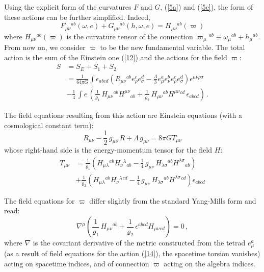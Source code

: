\documentclass [prd,reprint,eqsecnum,nofootinbib]  {revtex4-1}
\begin{document}
Using the explicit form of the curvatures $F$ and $G$, (\ref{5a})
and (\ref{5c}), the form of these actions can be further simplified.
Indeed,
$$
F_{\mu\nu}{}^{ab}(\omega, e) + G_{\mu\nu}{}^{ab}(h,\omega,e) =
H_{\mu\nu}{}^{ab}(\varpi)
$$
where $H_{\mu\nu}{}^{ab}(\varpi)$ is the curvature tensor of the
connection $\varpi_{\mu}{}^{ab}\equiv
\omega_{\mu}{}^{ab}+h_{\mu}{}^{ab}$. From now on, we consider
$\varpi$ to be the new fundamental variable. The total action is the
sum of the Einstein one (\ref{12}) and the actions for the field
$\varpi$:
\begin{align}
S &= S_E + S_1 +S_2 \nonumber\\
&=\frac{1}{64\pi
G}\int\epsilon_{abcd}\left(R_{\mu\nu}{}^{ab}e_{\rho}^{c}e_{\sigma}^{d}
-\frac{\Lambda}{3}e_{\mu}^{a}e_{\nu}^{b}e_{\rho}^{ c}e_{\sigma}^{
d}\right)\epsilon^{\mu\nu\rho\sigma}\nonumber\\
&-\frac14\,\int  e\, \left(\frac1{\varrho_1}\, H_{\mu\nu}{}^{ab}
H^{\mu\nu}{}_{ab}+ \frac1{\varrho_2}\,H_{\mu\nu}{}^{ab}
H^{\mu\nu}{}^{cd}\,\epsilon_{abcd}\right)\, .\label{14}
\end{align}

The field equations resulting from this action are Einstein
equations (with a cosmological constant term):
\begin{equation}\label{15a}
    R_{\mu\nu}-\frac12\, g_{\mu\nu}\, R +\Lambda\, g_{\mu\nu}= 8\pi G T_{\mu\nu}
\end{equation}
whose right-hand side is the energy-momentum tensor for the field
$H$:
\begin{align}
    T_{\mu\nu} &= \frac{1}{\varrho_1}\left(H_{\mu\lambda}{}^{ab} H_\nu{}^\lambda{}_{ab} -
    \frac14\, g_{\mu\nu}\,H_{\lambda\sigma}{}^{ab}
    H^{\lambda\sigma}{}_{ab}\right) \nonumber\\
    &+\frac{1}{\varrho_2}\left(H_{\mu\lambda}{}^{ab} H_\nu{}^\lambda{}^{cd} -
    \frac14\, g_{\mu\nu}\,H_{\lambda\sigma}{}^{ab}
    H^{\lambda\sigma}{}^{cd}\right)\epsilon_{abcd}\label{15}
\end{align}

The field equations for $\varpi$ differ slightly from the standard
Yang-Mills form and read:
\begin{equation}\label{16}
    \nabla^\mu \left(\frac1{\varrho_1}\, H_{\mu\nu}{}^{ab} +\frac1{\varrho_2}\,\epsilon^{abcd}
    H_{\mu\nu}{}_{cd}\right)=0\,,
\end{equation}
where $\nabla$ is the covariant derivative of the metric constructed
from the tetrad $e^a_\mu$ (as a result of field equations for the
action (\ref{14}), the spacetime torsion vanishes) acting on
spacetime indices, and of connection $\varpi$ acting on the algebra
indices.
\end{document}
